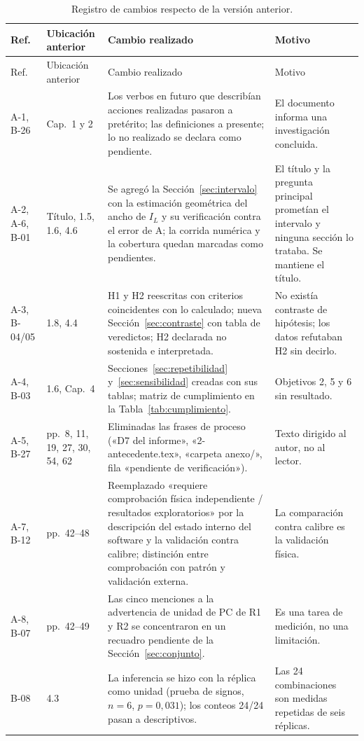 \documentclass{report}
\newcommand{\IL}{I_L}
\begin{document}
\begin{longtable}{@{}p{1.6cm}p{2.0cm}p{6.0cm}p{5.0cm}@{}}
\caption{Registro de cambios respecto de la versión anterior.}
\label{tab:registro-cambios}\\
\hline
Ref. & Ubicación anterior & Cambio realizado & Motivo \\
\hline
\endfirsthead
\hline
Ref. & Ubicación anterior & Cambio realizado & Motivo \\
\hline
\endhead
\hline
\endfoot
\endlastfoot
A-1, B-26 & Cap.~1 y 2 & Los verbos en futuro que describían acciones realizadas pasaron a pretérito; las definiciones a presente; lo no realizado se declara como pendiente. & El documento informa una investigación concluida. \\
A-2, A-6, B-01 & Título, 1.5, 1.6, 4.6 & Se agregó la Sección~\ref{sec:intervalo} con la estimación geométrica del ancho de $\IL$ y su verificación contra el error de A; la corrida numérica y la cobertura quedan marcadas como pendientes. & El título y la pregunta principal prometían el intervalo y ninguna sección lo trataba. Se mantiene el título. \\
A-3, B-04/05 & 1.8, 4.4 & H1 y H2 reescritas con criterios coincidentes con lo calculado; nueva Sección~\ref{sec:contraste} con tabla de veredictos; H2 declarada no sostenida e interpretada. & No existía contraste de hipótesis; los datos refutaban H2 sin decirlo. \\
A-4, B-03 & 1.6, Cap.~4 & Secciones~\ref{sec:repetibilidad} y~\ref{sec:sensibilidad} creadas con sus tablas; matriz de cumplimiento en la Tabla~\ref{tab:cumplimiento}. & Objetivos 2, 5 y 6 sin resultado. \\
A-5, B-27 & pp.~8, 11, 19, 27, 30, 54, 62 & Eliminadas las frases de proceso («D7 del informe», «2-antecedente.tex», «carpeta anexo/», fila «pendiente de verificación»). & Texto dirigido al autor, no al lector. \\
A-7, B-12 & pp.~42--48 & Reemplazado «requiere comprobación física independiente / resultados exploratorios» por la descripción del estado interno del software y la validación contra calibre; distinción entre comprobación con patrón y validación externa. & La comparación contra calibre es la validación física. \\
A-8, B-07 & pp.~42--49 & Las cinco menciones a la advertencia de unidad de PC de R1 y R2 se concentraron en un recuadro pendiente de la Sección~\ref{sec:conjunto}. & Es una tarea de medición, no una limitación. \\
B-08 & 4.3 & La inferencia se hizo con la réplica como unidad (prueba de signos, $n = 6$, $p = 0{,}031$); los conteos 24/24 pasan a descriptivos. & Las 24 combinaciones son medidas repetidas de seis réplicas. \\

\end{longtable}
\end{document}
